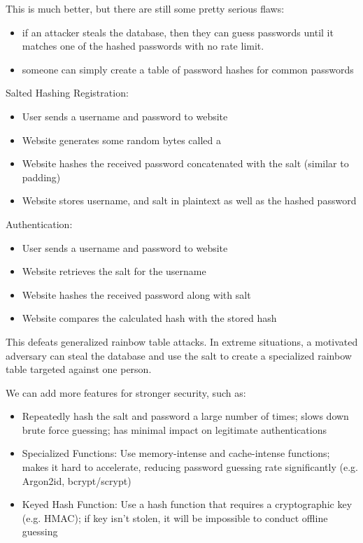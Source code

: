 \documentclass[12pt]{report}
\begin{document}
This is much better, but there are still some pretty serious flaws:
\begin{itemize}[noitemsep]
    \item {} if an attacker steals the database, then they can guess passwords until it matches one of the hashed passwords with no rate limit.
    \item {} someone can simply create a table of password hashes for common passwords
\end{itemize}

\begin{exbox}{Salted Hashing}{}
    Registration:
    \begin{itemize}[noitemsep]
        \item User sends a username and password to website
        \item Website generates some random bytes called a 
        \item Website hashes the received password concatenated with the salt (similar to padding)
        \item Website stores username, and salt in plaintext as well as the hashed password
    \end{itemize}
    Authentication:
    \begin{itemize}[noitemsep]
        \item User sends a username and password to website
        \item Website retrieves the salt for the username
        \item Website hashes the received password along with salt
        \item Website compares the calculated hash with the stored hash
    \end{itemize}
\end{exbox}

This defeats generalized rainbow table attacks. In extreme situations, a motivated adversary can steal the database and use the salt to create a specialized rainbow table targeted against one person.

We can add more features for stronger security, such as:
\begin{itemize}[noitemsep]
    \item {} Repeatedly hash the salt and password a large number of times; slows down brute force guessing; has minimal impact on legitimate authentications
    \item Specialized Functions: Use memory-intense and cache-intense functions; makes it hard to accelerate, reducing password guessing rate significantly (e.g. Argon2id, bcrypt/scrypt)
    \item Keyed Hash Function: Use a hash function that requires a cryptographic key (e.g. HMAC); if key isn't stolen, it will be impossible to conduct offline guessing
\end{itemize}
\end{document}
